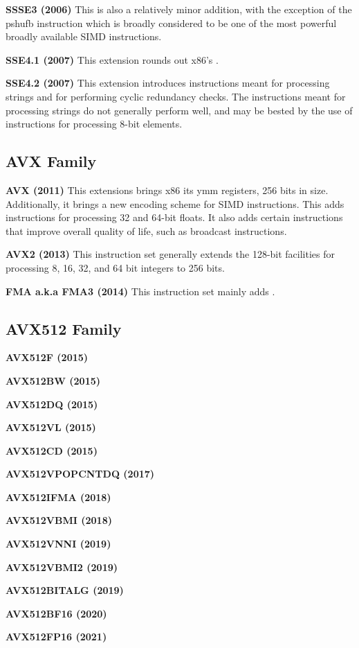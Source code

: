 \textbf{SSSE3 (2006)} This is also a relatively minor addition, with the
exception of the pshufb instruction which is broadly considered to be one of the
most powerful broadly available SIMD instructions. 

\textbf{SSE4.1 (2007)} This extension rounds out x86's .

\textbf{SSE4.2 (2007)} This extension introduces instructions meant for
processing strings and for performing cyclic redundancy checks. The instructions
meant for processing strings do not generally perform well, and may be bested by
the use of instructions for processing 8-bit elements.

\subsection{AVX Family}

\textbf{AVX (2011)} This extensions brings x86 its ymm registers, 256 bits in
size. Additionally, it brings a new encoding scheme for SIMD instructions. This
adds instructions for processing 32 and 64-bit floats. It also adds certain
instructions that improve overall quality of life, such as broadcast instructions.

\textbf{AVX2 (2013)} This instruction set generally extends the 128-bit
facilities for processing 8, 16, 32, and 64 bit integers to 256 bits.

\textbf{FMA a.k.a FMA3 (2014)} This instruction set mainly adds .

\subsection{AVX512 Family}
\textbf{AVX512F (2015)} 

\textbf{AVX512BW (2015)}

\textbf{AVX512DQ (2015)}

\textbf{AVX512VL (2015)}

\textbf{AVX512CD (2015)}

\textbf{AVX512VPOPCNTDQ (2017)}

\textbf{AVX512IFMA (2018)}

\textbf{AVX512VBMI (2018)}

\textbf{AVX512VNNI (2019)}

\textbf{AVX512VBMI2 (2019)}

\textbf{AVX512BITALG (2019)}

\textbf{AVX512BF16 (2020)}

\textbf{AVX512FP16 (2021)}

